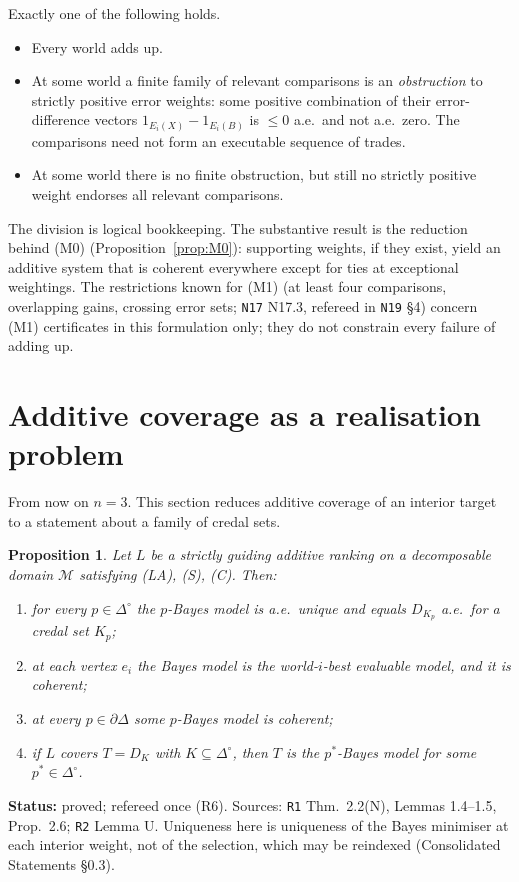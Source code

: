 \documentclass[11pt]{article}
\newtheorem{proposition}[theorem]{Proposition}
\theoremstyle{definition}
\theoremstyle{remark}
\newcommand{\Di}{\Delta^{\circ}}
\newcommand{\M}{\mathcal M}
\newcommand{\src}[1]{\texttt{#1}}
\newcommand{\status}[1]{\par\smallskip\noindent\textbf{Status:} #1\par\smallskip}
\begin{document}
Exactly one of the following holds.
\begin{itemize}[leftmargin=*]
\item[\textbf{(M0)}] Every world adds up.
\item[\textbf{(M1)}] At some world a finite family of relevant comparisons is an \emph{obstruction} to strictly positive error weights: some positive combination of their error-difference vectors $1_{E_i(X)}-1_{E_i(B)}$ is $\le0$ a.e.\ and not a.e.\ zero. The comparisons need not form an executable sequence of trades.
\item[\textbf{(M2)}] At some world there is no finite obstruction, but still no strictly positive weight endorses all relevant comparisons.
\end{itemize}
The division is logical bookkeeping. The substantive result is the reduction behind (M0) (Proposition~\ref{prop:M0}): supporting weights, if they exist, yield an additive system that is coherent everywhere except for ties at exceptional weightings. The restrictions known for (M1) (at least four comparisons, overlapping gains, crossing error sets; \src{N17} N17.3, refereed in \src{N19} \S4) concern (M1) certificates in this formulation only; they do not constrain every failure of adding up.

\section{Additive coverage as a realisation problem}\label{sec:reduction}

From now on $n=3$. This section reduces additive coverage of an interior target to a statement about a family of credal sets.

\begin{proposition}\label{prop:necessary}
Let $L$ be a strictly guiding additive ranking on a decomposable domain $\M$ satisfying (LA), (S), (C). Then:
\begin{enumerate}[leftmargin=*,label=(\alph*)]
\item for every $p\in\Di$ the $p$-Bayes model is a.e.\ unique and equals $D_{K_p}$ a.e.\ for a credal set $K_p$;
\item at each vertex $e_i$ the Bayes model is the world-$i$-best evaluable model, and it is coherent;
\item at every $p\in\partial\Delta$ some $p$-Bayes model is coherent;
\item if $L$ covers $T=D_K$ with $K\subseteq\Di$, then $T$ is the $p^*$-Bayes model for some $p^*\in\Di$.
\end{enumerate}
\end{proposition}
\status{proved; refereed once (R6). Sources: \src{R1} Thm.~2.2(N), Lemmas 1.4--1.5, Prop.~2.6; \src{R2} Lemma U. Uniqueness here is uniqueness of the Bayes minimiser at each interior weight, not of the selection, which may be reindexed (Consolidated Statements \S0.3).}
\end{document}
